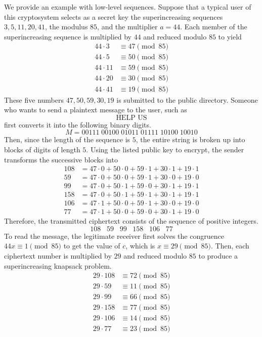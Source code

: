 \documentclass{article}
\theoremstyle{remark}
\theoremstyle{definition}
\begin{document}
We provide an example with low-level sequences. Suppose that a typical user of this cryptosystem selects as a secret key the superincreasing sequences $3, 5, 11, 20, 41$, the modulus $85$, and the multiplier $a = 44$. Each member of the superincreasing sequence is multiplied by $44$ and reduced modulo $85$ to yield 
\begin{align*}
    44 \cdot 3 &\equiv 47 \pmod{85} \\
    44 \cdot 5 &\equiv 50 \pmod{85} \\
    44 \cdot 11 &\equiv 59 \pmod{85} \\
    44 \cdot 20 &\equiv 30 \pmod{85} \\
    44 \cdot 41 &\equiv 19 \pmod{85} 
\end{align*}
These five numbers $47, 50, 59, 30, 19$ is submitted to the public directory. Someone who wants to send a plaintext message to the user, such as 
\[\text{HELP US}\]
first converts it into the following binary digits.
\[M = 00111\;00100\;01011\;01111\;10100\;10010\]
Then, since the length of the sequence is $5$, the entire string is broken up into blocks of digits of length $5$. Using the listed public key to encrypt, the sender transforms the successive blocks into 
\begin{align*}
    108 & = 47 \cdot 0 + 50 \cdot 0 + 59 \cdot 1 + 30 \cdot 1 + 19 \cdot 1 \\
    59 & = 47 \cdot 0 + 50 \cdot 0 + 59 \cdot 1 + 30 \cdot 0 + 19 \cdot 0 \\
    99 & = 47 \cdot 0 + 50 \cdot 1 + 59 \cdot 0 + 30 \cdot 1 + 19 \cdot 1 \\
    158 & = 47 \cdot 0 + 50 \cdot 1 + 59 \cdot 1 + 30 \cdot 1 + 19 \cdot 1 \\
    106 & = 47 \cdot 1 + 50 \cdot 0 + 59 \cdot 1 + 30 \cdot 0 + 19 \cdot 0 \\
    77 & = 47 \cdot 1 + 50 \cdot 0 + 59 \cdot 0 + 30 \cdot 1 + 19 \cdot 0
\end{align*}
Therefore, the transmitted ciphertext consists of the sequence of positive integers. 
\[108\;\;\;59\;\;\;99\;\;\;158\;\;\;106\;\;\;77\]
To read the message, the legitimate receiver first solves the congruence $44x \equiv 1 \pmod{85}$ to get the value of $c$, which is $x \equiv 29 \pmod{85}$. Then, each ciphertext number is multiplied by $29$ and reduced modulo $85$ to produce a superincreasing knapsack problem. 
\begin{align*}
    29 \cdot 108 & \equiv 72 \pmod{85} \\
    29 \cdot 59 & \equiv 11 \pmod{85} \\
    29 \cdot 99 & \equiv 66 \pmod{85} \\
    29 \cdot 158 & \equiv 77 \pmod{85} \\
    29 \cdot 106 & \equiv 14 \pmod{85} \\
    29 \cdot 77 & \equiv 23 \pmod{85}
\end{align*}
\end{document}
